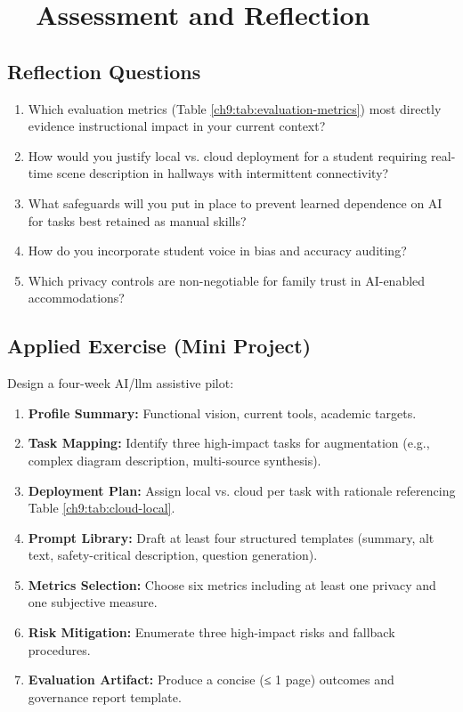 \section{~~Assessment and Reflection}\label{ch9:sec:assessment-reflection}

\subsection*{Reflection Questions}
\begin{enumerate}
	\item Which evaluation metrics (Table \ref{ch9:tab:evaluation-metrics}) most directly evidence instructional impact in your current context?
	\item How would you justify local vs. cloud deployment for a student requiring real-time scene description in hallways with intermittent connectivity?
	\item What safeguards will you put in place to prevent learned dependence on AI for tasks best retained as manual skills?
	\item How do you incorporate student voice in bias and accuracy auditing?
	\item Which privacy controls are non-negotiable for family trust in AI-enabled accommodations?
\end{enumerate}

\subsection*{Applied Exercise (Mini Project)}
Design a four-week AI/\gls{llm} assistive pilot:
\begin{enumerate}
	\item \textbf{Profile Summary:} Functional vision, current tools, academic targets.
	\item \textbf{Task Mapping:} Identify three high-impact tasks for augmentation (e.g., complex diagram description, multi-source synthesis).
	\item \textbf{Deployment Plan:} Assign local vs. cloud per task with rationale referencing Table \ref{ch9:tab:cloud-local}.
	\item \textbf{Prompt Library:} Draft at least four structured templates (summary, alt text, safety-critical description, question generation).
	\item \textbf{Metrics Selection:} Choose six metrics including at least one privacy and one subjective measure.
	\item \textbf{Risk Mitigation:} Enumerate three high-impact risks and fallback procedures.
	\item \textbf{Evaluation Artifact:} Produce a concise (≤ 1 page) outcomes and governance report template.
\end{enumerate}

